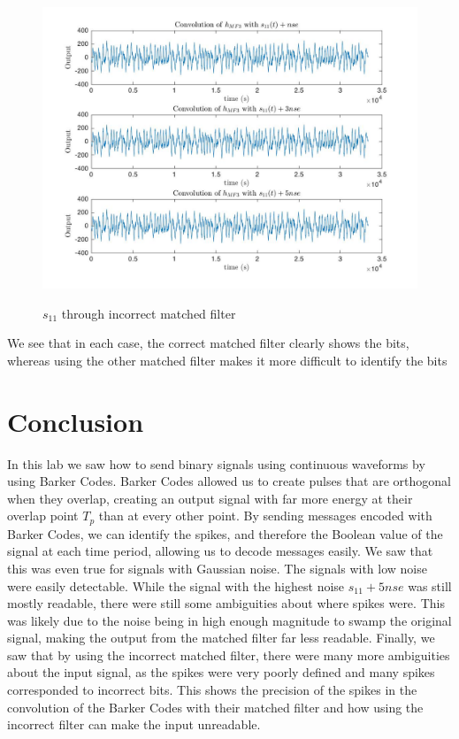 \documentclass{article}
\begin{document}
\begin{figure}[!htb]
    \centering
    \begin{minipage}{.5\textwidth}
        \centering
        \includegraphics[width=1.0\linewidth, height=0.2\textheight]{s11h3.jpg}

        \label{fig:prob1_6_2}
    \end{minipage}
    \caption{$s_{11}$ through incorrect matched filter}
\end{figure}

\FloatBarrier
We see that in each case, the correct matched filter clearly shows the bits, whereas using the other matched filter makes it more difficult to identify the bits 

\FloatBarrier
\section{Conclusion}
In this lab we saw how to send binary signals using continuous waveforms by using Barker Codes. Barker Codes allowed us to create pulses that are orthogonal when they overlap, creating an output signal with far more energy at their overlap point $T_p$ than at every other point. By sending messages encoded with Barker Codes, we can identify the spikes, and therefore the Boolean value of the signal at each time period, allowing us to decode messages easily. We saw that this was even true for signals with Gaussian noise. The signals with low noise were easily detectable. While the signal with the highest noise $s_11 + 5nse$ was still mostly readable, there were still some ambiguities about where spikes were. This was likely due to the noise being in high enough magnitude to swamp the original signal, making the output from the matched filter far less readable. Finally, we saw that by using the incorrect matched filter, there were many more ambiguities about the input signal, as the spikes were very poorly defined and many spikes corresponded to incorrect bits. This shows the precision of the spikes in the convolution of the Barker Codes with their matched filter and how using the incorrect filter can make the input unreadable. 
\end{document}
